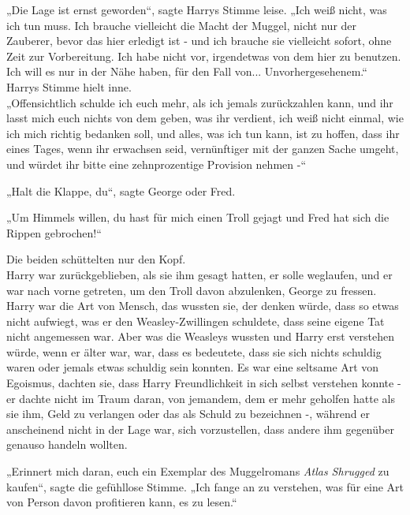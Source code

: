 {„Die Lage ist ernst geworden“, sagte Harrys Stimme leise. „Ich weiß nicht, was ich tun muss. Ich brauche vielleicht die Macht der Muggel, nicht nur der Zauberer, bevor das hier erledigt ist - und ich brauche sie vielleicht sofort, ohne Zeit zur Vorbereitung. Ich habe nicht vor, irgendetwas von dem hier zu benutzen. Ich will es nur in der Nähe haben, für den Fall von... Unvorhergesehenem.“\\ Harrys Stimme hielt inne.\\ „Offensichtlich schulde ich euch mehr, als ich jemals zurückzahlen kann, und ihr lasst mich euch nichts von dem geben, was ihr verdient, ich weiß nicht einmal, wie ich mich richtig bedanken soll, und alles, was ich tun kann, ist zu hoffen, dass ihr eines Tages, wenn ihr erwachsen seid, vernünftiger mit der ganzen Sache umgeht, und würdet ihr bitte eine zehnprozentige Provision nehmen -“

„Halt die Klappe, du“, sagte George oder Fred.

„Um Himmels willen, du hast für mich einen Troll gejagt und Fred hat sich die Rippen gebrochen!“

Die beiden schüttelten nur den Kopf.\\ Harry war zurückgeblieben, als sie ihm gesagt hatten, er solle weglaufen, und er war nach vorne getreten, um den Troll davon abzulenken, George zu fressen. Harry war die Art von Mensch, das wussten sie, der denken würde, dass so etwas nicht aufwiegt, was er den Weasley-Zwillingen schuldete, dass seine eigene Tat nicht angemessen war. Aber was die Weasleys wussten und Harry erst verstehen würde, wenn er älter war, war, dass es bedeutete, dass sie sich nichts schuldig waren oder jemals etwas schuldig sein konnten. Es war eine seltsame Art von Egoismus, dachten sie, dass Harry Freundlichkeit in sich selbst verstehen konnte - er dachte nicht im Traum daran, von jemandem, dem er mehr geholfen hatte als sie ihm, Geld zu verlangen oder das als Schuld zu bezeichnen -, während er anscheinend nicht in der Lage war, sich vorzustellen, dass andere ihm gegenüber genauso handeln wollten.

„Erinnert mich daran, euch ein Exemplar des Muggelromans \emph{Atlas Shrugged} zu kaufen“, sagte die gefühllose Stimme. „Ich fange an zu verstehen, was für eine Art von Person davon profitieren kann, es zu lesen.“

}
